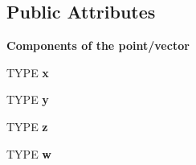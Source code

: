 \subsection*{Public Attributes}
\begin{Indent}\textbf{ Components of the point/vector}\par
\begin{DoxyCompactItemize}
\item 
\mbox{\label{classcy_1_1_point4_ac03b4cea739f8082e527d2873261a109}} 
T\+Y\+PE {\bfseries x}
\item 
\mbox{\label{classcy_1_1_point4_adc8469a37bd0131c4a5a9924c84ac5b0}} 
T\+Y\+PE {\bfseries y}
\item 
\mbox{\label{classcy_1_1_point4_a125700f4007807c9f179e77b71e430d2}} 
T\+Y\+PE {\bfseries z}
\item 
\mbox{\label{classcy_1_1_point4_a631984ef10deb521b8f8d0f8655c2da1}} 
T\+Y\+PE {\bfseries w}
\end{DoxyCompactItemize}
\end{Indent}

